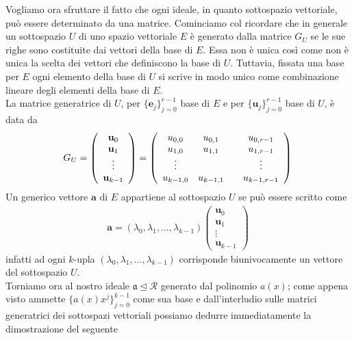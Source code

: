 Vogliamo ora sfruttare il fatto che ogni ideale, in quanto sottospazio vettoriale, può essere determinato da una matrice. Cominciamo col ricordare che in generale un sottospazio $U$ di uno spazio vettoriale $E$ è generato dalla matrice $G_{U}$ se le sue righe sono costituite dai vettori della base di $E$. Essa non è unica così come non è unica la scelta dei vettori che definiscono la base di $U$. Tuttavia, fissata una base per $E$ ogni elemento della base di $U$ si scrive in modo unico come combinazione lineare degli elementi della base di $E$.\\
La matrice generatrice di $U$, per $\lbrace \mathbf{e}_{j} \rbrace_{j=0}^{r-1}$ base di $E$ e per $\lbrace \mathbf{u}_{j} \rbrace_{j=0}^{r-1}$ base di $U$, è data da
\begin{align*}
G_{U}
=
\left(
\begin{array} {c}
  \mathbf{u}_{0} \\
  \mathbf{u}_{1} \\
  \vdots \\
  \mathbf{u}_{k-1}
\end{array}
\right)
=
\left(
\begin{array} {c c c c}
u_{0,0} & u_{0,1} & & u_{0,r-1}  \\
u_{1,0} & u_{1,1} & & u_{1,r-1}  \\
\vdots &  & & \vdots  \\
u_{k-1,0} & u_{k-1,1} & & u_{k-1,r-1}
\end{array}
\right)
\end{align*}
Un generico vettore $\mathbf{a}$ di $E$ appartiene al sottospazio $U$ se può essere scritto come
\begin{align*}
\mathbf{a}
=
(\lambda_{0}, \lambda_{1}, \dots , \lambda_{k-1})
\left(
\begin{array} {c}
  \mathbf{u}_{0} \\
  \mathbf{u}_{1} \\
  \vdots \\
  \mathbf{u}_{k-1}
\end{array}
\right)
\end{align*}
infatti ad ogni $k$-upla $(\lambda_{0}, \lambda_{1}, \dots , \lambda_{k-1})$ corrisponde biunivocamente un vettore del sottospazio $U$.
\\
Torniamo ora al nostro ideale $\mathfrak{a} \unlhd \mathcal{R}$ generato dal polinomio $a(x)$; come appena visto ammette $\lbrace a(x)x^{j} \rbrace_{j=0}^{k-1}$ come sua base e dall'interludio sulle matrici generatrici dei sottospazi vettoriali possiamo dedurre immediatamente la dimostrazione del seguente
